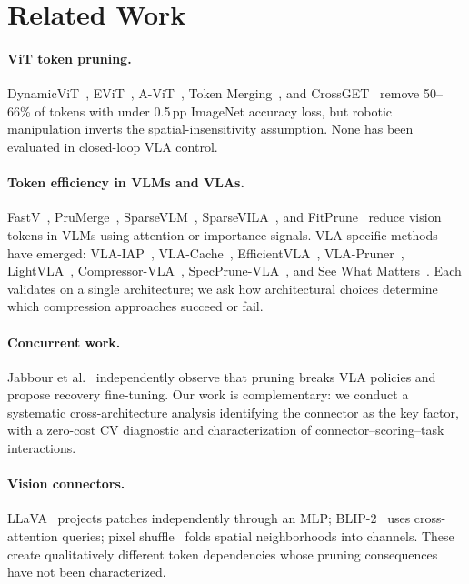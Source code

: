 \section{Related Work}
\label{sec:related_work}

\paragraph{ViT token pruning.}
DynamicViT~\cite{rao2021dynamicvit}, EViT~\cite{liang2022evit}, A-ViT~\cite{yin2022avit}, Token Merging~\cite{bolya2023tome}, and CrossGET~\cite{shi2024crossget} remove 50--66\% of tokens with under 0.5\,pp ImageNet accuracy loss, but robotic manipulation inverts the spatial-insensitivity assumption. None has been evaluated in closed-loop VLA control.

\paragraph{Token efficiency in VLMs and VLAs.}
FastV~\cite{chen2024fastv}, PruMerge~\cite{shang2024prumerge}, SparseVLM~\cite{zhang2025sparsevlm}, SparseVILA~\cite{khaki2025sparsevila}, and FitPrune~\cite{ye2025fitprune} reduce vision tokens in VLMs using attention or importance signals. VLA-specific methods have emerged: VLA-IAP~\cite{cheng2026vlaiap}, VLA-Cache~\cite{xu2025vlacache}, EfficientVLA~\cite{yang2025efficientvla}, VLA-Pruner~\cite{liu2025vlapruner}, LightVLA~\cite{jiang2026lightvla}, Compressor-VLA~\cite{gao2025compressorvla}, SpecPrune-VLA~\cite{wang2025specprunevla}, and See What Matters~\cite{feng2026seewhatmatters}. Each validates on a single architecture; we ask how architectural choices determine which compression approaches succeed or fail.

\paragraph{Concurrent work.}
Jabbour et al.~\cite{jabbour2025dontrun} independently observe that pruning breaks VLA policies and propose recovery fine-tuning. Our work is complementary: we conduct a systematic cross-architecture analysis identifying the connector as the key factor, with a zero-cost CV diagnostic and characterization of connector--scoring--task interactions.

\paragraph{Vision connectors.}
LLaVA~\cite{liu2023llava} projects patches independently through an MLP; BLIP-2~\cite{li2023blip2} uses cross-attention queries; pixel shuffle~\cite{shi2016subpixel} folds spatial neighborhoods into channels. These create qualitatively different token dependencies whose pruning consequences have not been characterized.
